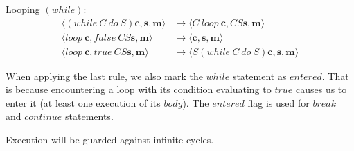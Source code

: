 \documentclass[11pt]{report}
\begin{document}
\vspace{2em}
\noindent Looping $(while)$:
\begin{align*}
\langle (while\ C\ do\ S)  \bm{c},  \bm{s},  \bm{m} \rangle    &\rightarrow  \langle C\ loop\  \bm{c}, C S  \bm{s},  \bm{m} \rangle \\
\langle loop\  \bm{c}, false\ C S  \bm{s},  \bm{m} \rangle    &\rightarrow   \langle  \bm{c},  \bm{s},  \bm{m} \rangle \\
\langle loop\  \bm{c}, true\  C S  \bm{s},  \bm{m} \rangle    &\rightarrow   \langle S (while\ C\ do\ S)  \bm{c},  \bm{s},  \bm{m} \rangle 
\end{align*}

When applying the last rule, we also mark the $while$ statement as $entered$. That is because encountering a loop with its condition evaluating to $true$ causes us to enter it (at least one execution of its $body$). The $entered$ flag is used for $break$ and $continue$ statements.

Execution will be guarded against infinite cycles.
\end{document}
